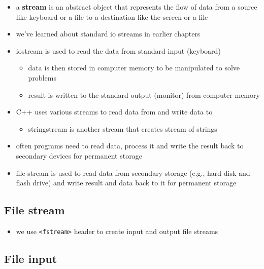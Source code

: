 \documentclass[11pt]{article}
\providecommand{\tightlist}{%
      \setlength{\itemsep}{0pt}\setlength{\parskip}{0pt}}
\begin{document}
\begin{itemize}
\tightlist
\item
  a \textbf{stream} is an abstract object that represents the flow of
  data from a source like keyboard or a file to a destination like the
  screen or a file
\item
  we've learned about standard io streams in earlier chapters
\item
  iostream is used to read the data from standard input (keyboard)

  \begin{itemize}
  \tightlist
  \item
    data is then stored in computer memory to be manipulated to solve
    problems
  \item
    result is written to the standard output (monitor) from computer
    memory
  \end{itemize}
\item
  C++ uses various streams to read data from and write data to

  \begin{itemize}
  \tightlist
  \item
    stringstream is another stream that creates stream of strings
  \end{itemize}
\item
  often programs need to read data, process it and write the result back
  to secondary devices for permanent storage
\item
  file stream is used to read data from secondary storage (e.g., hard
  disk and flash drive) and write result and data back to it for
  permanent storage
\end{itemize}

    \hypertarget{file-stream}{%
\subsection{File stream}\label{file-stream}}

\begin{itemize}
\tightlist
\item
  we use \texttt{\textless{}fstream\textgreater{}} header to create
  input and output file streams
\end{itemize}

\hypertarget{file-input}{%
\subsection{File input}\label{file-input}}
\end{document}
